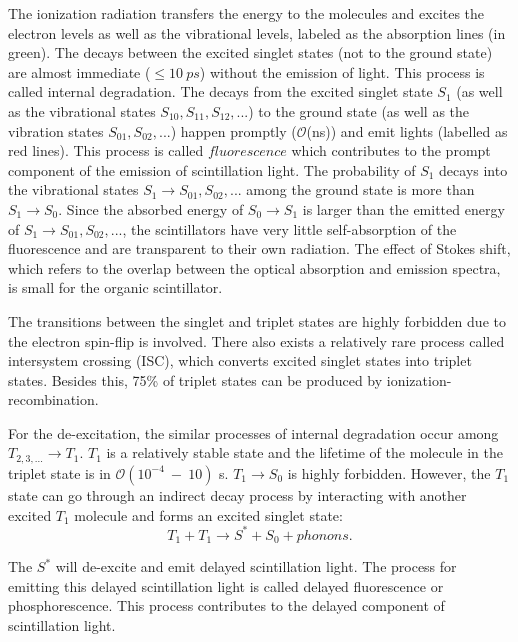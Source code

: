 The ionization radiation transfers the energy to the molecules and excites the electron levels as well as the vibrational levels, labeled as the absorption lines (in green). The decays between the excited singlet states (not to the ground state) are almost immediate ($\leq 10~ps$) without the emission of light. This process is called internal degradation. The decays from the excited singlet state $S_1$ (as well as the vibrational states $S_{10},S_{11},S_{12},...$) to the ground state (as well as the vibration states $S_{01}, S_{02}, ...$) happen promptly ($\mathcal{O}$(ns)) and emit lights (labelled as red lines). This process is called $fluorescence$ which contributes to the prompt component of the emission of scintillation light. The probability of $S_1$ decays into the vibrational states $S_1 \to S_{01},S_{02},...$ among the ground state is more than $S_1\to S_0$. Since the absorbed energy of $S_0 \to S_1$ is larger than the emitted energy of $S_1 \to S_{01}, S_{02},...$, the scintillators have very little self-absorption of the fluorescence and are transparent to their own radiation. The effect of Stokes shift, which refers to the overlap between the optical absorption and emission spectra, is small for the organic scintillator\cite{leo2012techniques,knoll2010radiation}. 

The transitions between the singlet and triplet states are highly forbidden due to the
electron spin-flip is involved\cite{von2015measurement,sorensen2016temperature}. There also exists a relatively rare process called intersystem crossing (ISC), which converts excited singlet states into triplet states. Besides this, 75\% of triplet states can be produced by ionization-recombination\cite{von2015measurement,dunger2018topological}.

For the de-excitation, the similar processes of internal degradation occur among $T_{2,3, ...} \to T_1$. $T_1$ is a relatively stable state and the lifetime of the molecule in the triplet state is in $\mathcal{O}(10^{-4}~-~10)$ s\cite{mcquarrie1997physical}. $T_1\to S_0$ is highly forbidden. However, the $T_1$ state can go through an indirect decay process by interacting with another excited $T_1$ molecule and forms an excited singlet state:
\begin{equation}
T_1+T_1\to S^*+S_0+phonons.
\end{equation}

The $S^*$ will de-excite and emit delayed scintillation light. The process for emitting this delayed scintillation light is called delayed fluorescence or phosphorescence\cite{leo2012techniques}. This process contributes to the delayed component of scintillation light.


